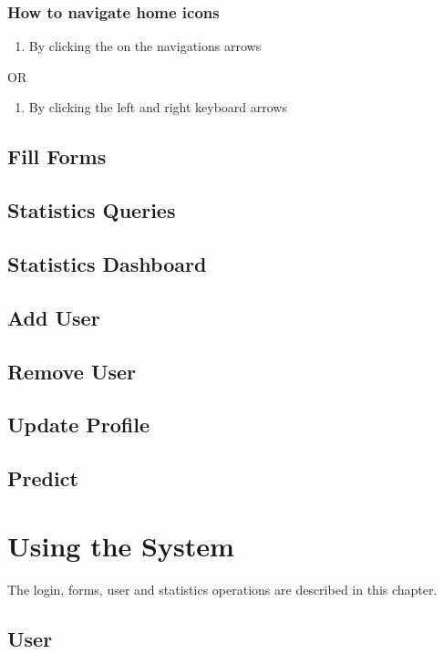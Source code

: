 \documentclass[14pt, a4paper]{article}
\begin{document}
	\subsubsection{How to navigate home icons}
		\begin{enumerate}
			\item By clicking the on the navigations arrows
		\end{enumerate}
		\begin{center} OR \end{center}
		\begin{enumerate}
			\item By clicking the left and right keyboard arrows
		\end{enumerate}
\subsection{Fill Forms}
\subsection{Statistics Queries}
\subsection{Statistics Dashboard}
\subsection{Add User}
\subsection{Remove User}
\subsection{Update Profile}
\subsection{Predict}
\newpage


\section{Using the System}
\begin{description}
\item The login, forms, user and statistics operations are described in this chapter.
\end{description}


\subsection{User}
	  
\end{document}
